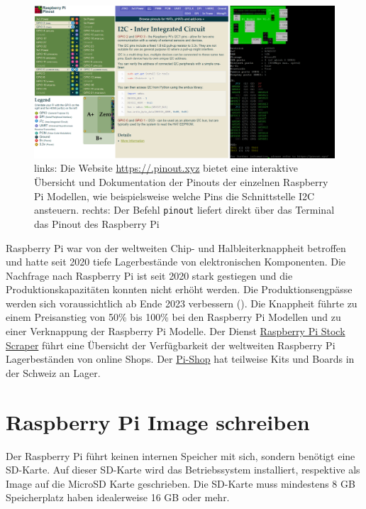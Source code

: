 \documentclass[
  11pt,
  a4paperpaper,
  oneside, openany  ,captions=tableheading
]{scrbook}
\theoremstyle{definition}
\theoremstyle{remark}
\begin{document}
\begin{figure}[H]

{\centering \includegraphics{images/pinout.png}

}

\caption{links: Die Website \url{https://.pinout.xyz} bietet eine
interaktive Übersicht und Dokumentation der Pinouts der einzelnen
Raspberry Pi Modellen, wie beispielsweise welche Pins die Schnittstelle
I2C ansteuern. rechts: Der Befehl \texttt{pinout} liefert direkt über
das Terminal das Pinout des Raspberry Pi}

\end{figure}%

Raspberry Pi war von der weltweiten Chip- und Halbleiterknappheit
betroffen und hatte seit 2020 tiefe Lagerbestände von elektronischen
Komponenten. Die Nachfrage nach Raspberry Pi ist seit 2020 stark
gestiegen und die Produktionskapazitäten konnten nicht erhöht werden.
Die Produktionsengpässe werden sich voraussichtlich ab Ende 2023
verbessern (). Die Knappheit führte
zu einem Preisanstieg von 50\% bis 100\% bei den Raspberry Pi Modellen
und zu einer Verknappung der Raspberry Pi Modelle. Der Dienst
\href{https://rpilocator.com/?country=CH}{Raspberry Pi Stock Scraper}
führt eine Übersicht der Verfügbarkeit der weltweiten Raspberry Pi
Lagerbeständen von online Shops. Der
\href{https://www.pi-shop.ch/bundles-kits}{Pi-Shop} hat teilweise Kits
und Boards in der Schweiz an Lager.

\section{Raspberry Pi Image
schreiben}\label{raspberry-pi-image-schreiben}

Der Raspberry Pi führt keinen internen Speicher mit sich, sondern
benötigt eine SD-Karte. Auf dieser SD-Karte wird das Betriebssystem
installiert, respektive als Image auf die MicroSD Karte geschrieben. Die
SD-Karte muss mindestens 8 GB Speicherplatz haben idealerweise 16 GB
oder mehr.
\end{document}
